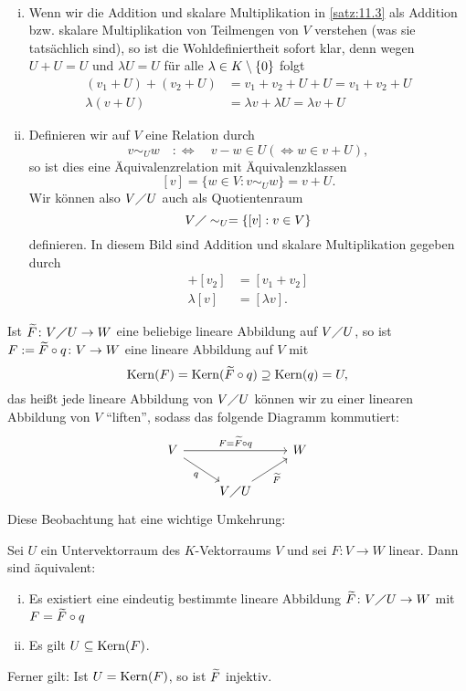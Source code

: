 \begin{bemerkung}
	\label{bem:11.4}
	\mbox{} \\[-1.4cm]
	\begin{enumerate}[(i)]
		\item Wenn wir die Addition und skalare Multiplikation in \autoref{satz:11.3} als Addition bzw. skalare Multiplikation von Teilmengen von $V$ verstehen (was sie tatsächlich sind), so ist die Wohldefiniertheit sofort klar, denn wegen $U+U = U$ und $\lambda U = U$ für alle $\lambda \in K \setminus \{0\}$ folgt
		\begin{align*}
			(v_1+U)+(v_2+U) &= v_1+v_2+U+U = v_1 + v_2 + U \\
			\lambda(v+U) &= \lambda v + \lambda U = \lambda v + U
		\end{align*}
		\item Definieren wir auf $V$ eine Relation durch
		\[
			v \sim_U w \quad :\Leftrightarrow \quad v-w \in U (\Leftrightarrow w \in v+U),
		\]
		so ist dies eine Äquivalenzrelation mit Äquivalenzklassen 
		\[
			[v] = \{w \in V : v \sim_U w\} = v + U.
		\]
		Wir können also $V \diagup U$ auch als Quotientenraum
		\[
			V \diagup \sim_U = \{ [v] : v \in V\}
		\]
		definieren.
		In diesem Bild sind Addition und skalare Multiplikation gegeben durch
		\begin{align*}
			[v_1] + [v_2] &= [v_1 + v_2] \\
			\lambda [v] &= [\lambda v].
		\end{align*}
	\end{enumerate}
\end{bemerkung}

\begin{bemerkung}
	\label{bem:11.5}
	Ist $\widetilde{F}\colon V \diagup U \rightarrow W$ eine beliebige lineare Abbildung auf $V \diagup U$, so ist $F := \widetilde{F} \circ q \colon V \rightarrow W$ eine lineare Abbildung auf $V$ mit
	\[
		\operatorname{Kern}(F) = \operatorname{Kern}(\widetilde{F} \circ q) \supseteq \operatorname{Kern}(q) = U,
	\]
	das heißt jede lineare Abbildung von $V \diagup U$ können wir zu einer linearen Abbildung von $V$ \enquote{liften}, sodass das folgende Diagramm kommutiert:
	\[
		\begin{tikzcd}
			V \arrow[rr,"F=\wt{F} \circ q"] \arrow[rd,"q"'] & & W \\
			& V \diagup U \arrow[ru,"\wt{F}"'] &
		\end{tikzcd}
	\]
	Diese Beobachtung hat eine wichtige Umkehrung:
\end{bemerkung}

\begin{satz}[Homomorphiesatz]
	\label{satz:11.6}
	Sei $U$ ein Untervektorraum des $K$-Vektorraums $V$ und sei $F \colon V \rightarrow W$ linear.
	Dann sind äquivalent:
	\begin{enumerate}[(i)]
		\item Es existiert eine eindeutig bestimmte lineare Abbildung $\widetilde{F} \colon V \diagup U \rightarrow W$ mit $F = \widetilde{F} \circ q$
		\item Es gilt $U \subseteq \operatorname{Kern}(F)$.
	\end{enumerate}
	Ferner gilt:
	Ist $U = \operatorname{Kern}(F)$, so ist $\widetilde{F}$ injektiv.
\end{satz}


